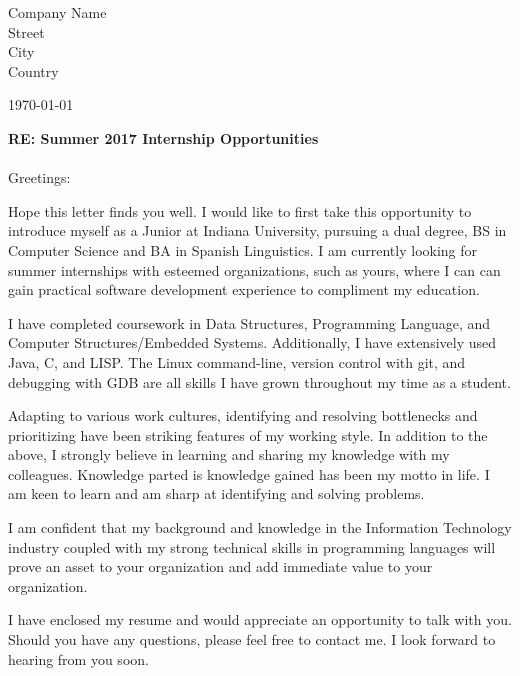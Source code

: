 \documentclass[letterpaper,11pt]{letter}
\begin{document}
\renewcommand{\myName}{Jeremy R. Benedek}
\renewcommand{\closing}{Yours Faithfully: }

\begin{letter}{Company Name \\Street \\City \\Country \\}
  \date{}
  \myheader
  \resheading{}
  \vspace*{\fill}
\begin{flushleft} \today{}  \end{flushleft}
  \opening{\textbf{RE: Summer 2017 Internship Opportunities}\\~\\  Greetings:}


  Hope this letter finds you well. I would like to first take this opportunity to introduce myself as 
  a Junior at Indiana University, pursuing a dual degree, BS in Computer Science and BA in Spanish Linguistics. 
  I am currently looking for summer internships with esteemed organizations, such as yours, where I can can gain practical 
  software development experience to compliment my education. 

  I have completed coursework in Data Structures, Programming Language, and Computer Structures/Embedded Systems. Additionally, I have
  extensively used Java, C, and LISP. The Linux command-line, version control with git, and debugging with GDB are all skills I have grown
  throughout my time as a student. 

  Adapting to various work cultures, identifying and resolving bottlenecks and prioritizing have been striking features of my working style. 
  In addition to the above, I strongly believe in learning and sharing my knowledge with my colleagues. 
  Knowledge parted is knowledge gained has been my motto in life.
  I am keen to learn and am sharp at identifying and solving problems.

  I am confident that my background and knowledge in the Information Technology industry coupled 
  with my strong technical skills in programming languages will prove an asset to your organization 
  and add immediate value to your organization.

  I have enclosed my resume and would appreciate an opportunity to talk with you. 
  Should you have any questions, please feel free to contact me. I look forward to hearing from you soon.


  ~\\  
  \mysignature  

  \vspace*{\fill}
  \footCover
\end{letter}
\end{document}
